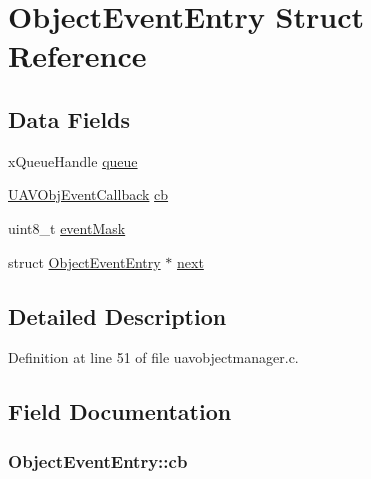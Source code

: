 \hypertarget{struct_object_event_entry}{\section{\-Object\-Event\-Entry \-Struct \-Reference}
\label{struct_object_event_entry}
}
\subsection*{\-Data \-Fields}
\begin{DoxyCompactItemize}
\item 
x\-Queue\-Handle \hyperlink{struct_object_event_entry_a458a6b3068168aff7f61a922a5011673}{queue}
\item 
\hyperlink{targets_2_u_a_v_objects_2inc_2uavobjectmanager_8h_a33d11560e38b56dc904220fb0f785c28}{\-U\-A\-V\-Obj\-Event\-Callback} \hyperlink{struct_object_event_entry_a202f15e5d4be2ca706b2f9ed6fa27d81}{cb}
\item 
uint8\-\_\-t \hyperlink{struct_object_event_entry_a7943bff77f5f644659a1cb59d7f0b176}{event\-Mask}
\item 
struct \hyperlink{struct_object_event_entry}{\-Object\-Event\-Entry} $\ast$ \hyperlink{struct_object_event_entry_af10cb19d61193416975d2cb2c78bf620}{next}
\end{DoxyCompactItemize}


\subsection{\-Detailed \-Description}


\-Definition at line 51 of file uavobjectmanager.\-c.



\subsection{\-Field \-Documentation}
\hypertarget{struct_object_event_entry_a202f15e5d4be2ca706b2f9ed6fa27d81}{
\subsubsection[{cb}]{ {\bf \-Object\-Event\-Entry\-::cb}}}\label{struct_object_event_entry_a202f15e5d4be2ca706b2f9ed6fa27d81}


